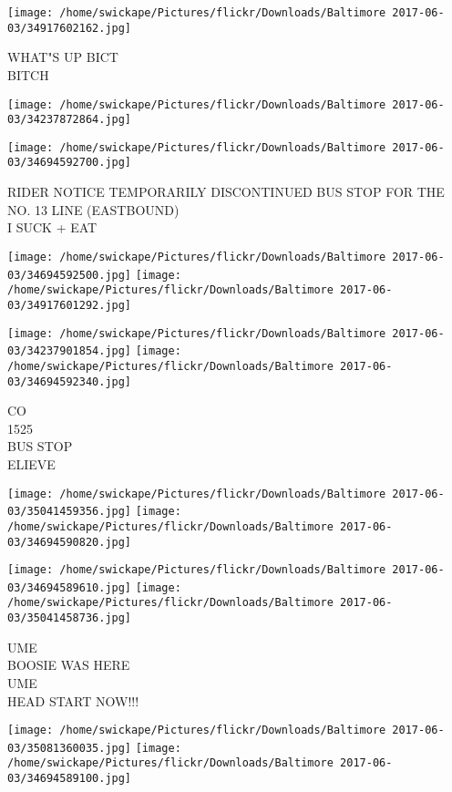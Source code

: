 \documentclass[10pt,letterpaper]{article}
\begin{document}
\vspace{0.25in}
\texttt{[image: /home/swickape/Pictures/flickr/Downloads/Baltimore 2017-06-03/34917602162.jpg]}

WHAT"S UP BICT\\
BITCH\\
\pagebreak

\texttt{[image: /home/swickape/Pictures/flickr/Downloads/Baltimore 2017-06-03/34237872864.jpg]}

\vspace{0.25in}
\texttt{[image: /home/swickape/Pictures/flickr/Downloads/Baltimore 2017-06-03/34694592700.jpg]}

RIDER NOTICE TEMPORARILY DISCONTINUED BUS STOP FOR THE NO. 13 LINE (EASTBOUND)\\
I SUCK + EAT\\
\pagebreak

\texttt{[image: /home/swickape/Pictures/flickr/Downloads/Baltimore 2017-06-03/34694592500.jpg]}
\texttt{[image: /home/swickape/Pictures/flickr/Downloads/Baltimore 2017-06-03/34917601292.jpg]}

\texttt{[image: /home/swickape/Pictures/flickr/Downloads/Baltimore 2017-06-03/34237901854.jpg]}
\texttt{[image: /home/swickape/Pictures/flickr/Downloads/Baltimore 2017-06-03/34694592340.jpg]}

CO\\
1525\\
BUS STOP\\
ELIEVE\\
\pagebreak

\texttt{[image: /home/swickape/Pictures/flickr/Downloads/Baltimore 2017-06-03/35041459356.jpg]}
\texttt{[image: /home/swickape/Pictures/flickr/Downloads/Baltimore 2017-06-03/34694590820.jpg]}

\texttt{[image: /home/swickape/Pictures/flickr/Downloads/Baltimore 2017-06-03/34694589610.jpg]}
\texttt{[image: /home/swickape/Pictures/flickr/Downloads/Baltimore 2017-06-03/35041458736.jpg]}

UME\\
BOOSIE WAS HERE\\
UME\\
HEAD START NOW!!!\\
\pagebreak

\texttt{[image: /home/swickape/Pictures/flickr/Downloads/Baltimore 2017-06-03/35081360035.jpg]}
\texttt{[image: /home/swickape/Pictures/flickr/Downloads/Baltimore 2017-06-03/34694589100.jpg]}
\end{document}
